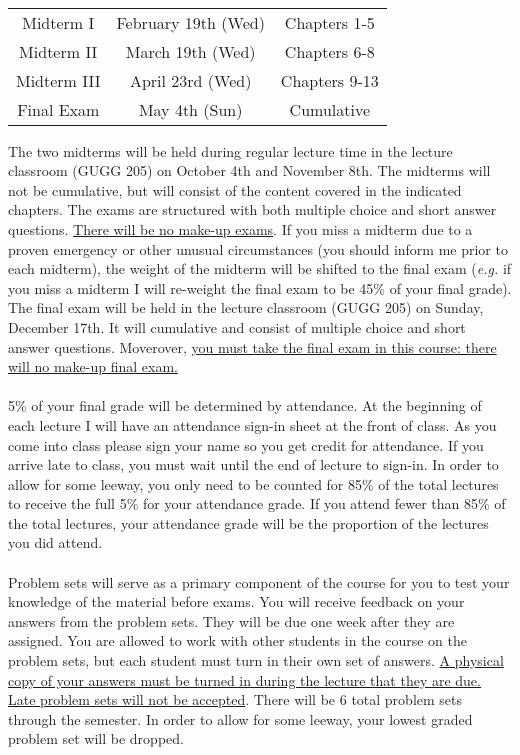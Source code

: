 \documentclass[11pt]{article}
\begin{document}
\\\begin{center}
\begin{tabular}{ccc}
    Midterm I & February 19th (Wed) & Chapters 1-5 \\
    Midterm II & March 19th (Wed) & Chapters 6-8 \\
   	Midterm III & April 23rd (Wed) & Chapters 9-13 \\
    Final Exam & May 4th (Sun) & Cumulative \\
\end{tabular}
\end{center}
The two midterms will be held during regular lecture time in the lecture classroom (GUGG 205) on October 4th and November 8th.  The midterms will not be cumulative, but will consist of the content covered in the indicated chapters.  The exams are structured with both multiple choice and short answer questions.  \uline{There will be no make-up exams}.  If you miss a midterm due to a proven emergency or other unusual circumstances (you should inform me prior to each midterm), the weight of the midterm will be shifted to the final exam (\emph{e.g.} if you miss a midterm I will re-weight the final exam to be 45\% of your final grade).  The final exam will be held in the lecture classroom (GUGG 205) on Sunday, December 17th.  It will cumulative and consist of multiple choice and short answer questions.  Moverover, \uline{you must take the final exam in this course: there will no make-up final exam.} \\

\newpage
{}\\
5\% of your final grade will be determined by attendance.  At the beginning of each lecture I will have an attendance sign-in sheet at the front of class.  As you come into class please sign your name so you get credit for attendance.  If you arrive late to class, you must wait until the end of lecture to sign-in.  In order to allow for some leeway, you only need to be counted for 85\% of the total lectures to receive the full 5\% for your attendance grade.  If you attend fewer than 85\% of the total lectures, your attendance grade will be the proportion of the lectures you did attend.\\

\\
Problem sets will serve as a primary component of the course for you to test your knowledge of the material before exams.  You will receive feedback on your answers from the problem sets.  They will be due one week after they are assigned.  You are allowed to work with other students in the course on the problem sets, but each student must turn in their own set of answers.  \uline{A physical copy of your answers must be turned in during the lecture that they are due.  Late problem sets will not be accepted}.  There will be 6 total problem sets through the semester.  In order to allow for some leeway, your lowest graded problem set will be dropped.\\ 
\end{document}
